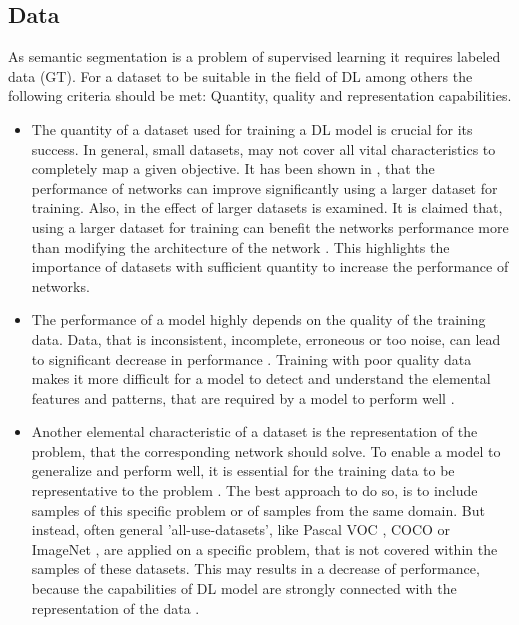 \subsection{Data}\label{ord:ch2:sec2:subsec4}
As semantic segmentation is a problem of supervised learning it requires labeled data (GT).
For a dataset to be suitable in the field of DL among others the following criteria should be met: Quantity, quality and representation capabilities.
\begin{itemize}
	\item The quantity of a dataset used for training a DL model is crucial for its success.
	In general, small datasets, may not cover all vital characteristics to completely map a given objective.
	It has been shown in \cite{Banko01-ScalingData}, that the performance of networks can improve significantly using a larger dataset for training.
	Also, in \cite{Halevy09-UnreasonableEffectivenessOfData} the effect of larger datasets is examined. 
	It is claimed that, using a larger dataset for training can benefit the networks performance more than modifying the architecture of the network \cite{Ger17-HandsOn} \cite{Fer19-SemSeg}.
	This highlights the importance of datasets with sufficient quantity to increase the performance of networks.
	\item The performance of a model highly depends on the quality of the training data. 
	Data, that is inconsistent, incomplete, erroneous or too noise, can lead to significant decrease in performance \cite{Gudivada2017-DataQuality}.
	Training with poor quality data makes it more difficult for a model to detect and understand the elemental features and patterns, that are required by a model to perform well \cite{Ger17-HandsOn}.
	\item Another elemental characteristic of a dataset is the representation of the problem, that the corresponding network should solve.
	To enable a model to generalize and perform well, it is essential for the training data to be representative to the problem \cite{Ger17-HandsOn}.
	The best approach to do so, is to include samples of this specific problem or of samples from the same domain.	
	But instead, often general 'all-use-datasets', like Pascal VOC \cite{Eve20-PascalVOC}, COCO \cite{Lin14-Coco} or ImageNet \cite{Deng09-ImageNet}, are applied on a specific problem, that is not covered within the samples of these datasets.
	This may results in a decrease of performance, because the capabilities of DL model are strongly connected with the representation of the data \cite{Goodfellow-et-al-2016}.
\end{itemize} 
